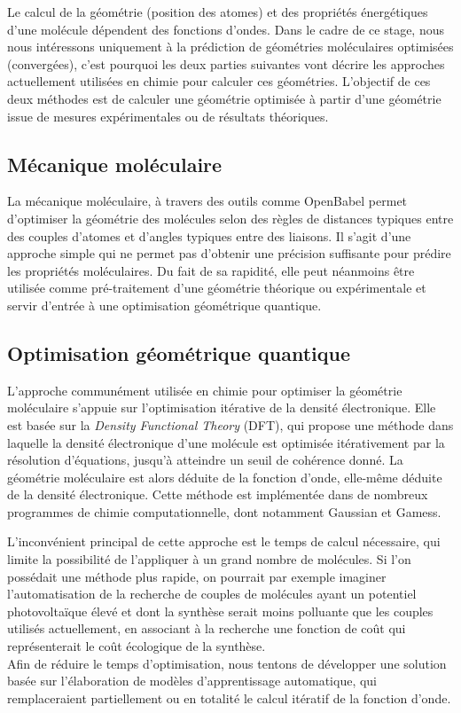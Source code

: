 \par Le calcul de la géométrie (position des atomes) et des propriétés énergétiques d'une molécule dépendent des fonctions d'ondes. Dans le cadre de ce stage, nous nous intéressons uniquement à la prédiction de géométries moléculaires optimisées (convergées), c'est pourquoi les deux parties suivantes vont décrire les approches actuellement utilisées en chimie pour calculer ces géométries. L'objectif de ces deux méthodes est de calculer une géométrie optimisée à partir d'une géométrie issue de mesures expérimentales ou de résultats théoriques.

\subsection{Mécanique moléculaire}
La mécanique moléculaire, à travers des outils comme OpenBabel\cite{openbabel} permet d'optimiser la géométrie des molécules selon des règles de distances typiques entre des couples d'atomes et d'angles typiques entre des liaisons. Il s'agit d'une approche simple qui ne permet pas d'obtenir une précision suffisante pour prédire les propriétés moléculaires. Du fait de sa rapidité, elle peut néanmoins être utilisée comme pré-traitement d'une géométrie théorique ou expérimentale et servir d'entrée à une optimisation géométrique quantique. 

\subsection{Optimisation géométrique quantique}
\par L'approche communément utilisée en chimie pour optimiser la géométrie moléculaire s'appuie sur l'optimisation itérative de la densité électronique. Elle est basée sur la \emph{Density Functional Theory} (DFT), qui propose une méthode dans laquelle la densité électronique d'une molécule est optimisée itérativement par la résolution d'équations, jusqu'à atteindre un seuil de cohérence donné. La géométrie moléculaire est alors déduite de la fonction d'onde, elle-même déduite de la densité électronique. Cette méthode est implémentée dans de nombreux programmes de chimie computationnelle, dont notamment Gaussian et Gamess.\\

\par L'inconvénient principal de cette approche est le temps de calcul nécessaire, qui limite la possibilité de l'appliquer à un grand nombre de molécules. Si l'on possédait une méthode plus rapide, on pourrait par exemple imaginer l'automatisation de la recherche de couples de molécules ayant un potentiel photovoltaïque élevé et dont la synthèse serait moins polluante que les couples utilisés actuellement, en associant à la recherche une fonction de coût qui représenterait le coût écologique de la synthèse.\\
Afin de réduire le temps d'optimisation, nous tentons de développer une solution basée sur l'élaboration de modèles d'apprentissage automatique, qui remplaceraient partiellement ou en totalité le calcul itératif de la fonction d'onde.